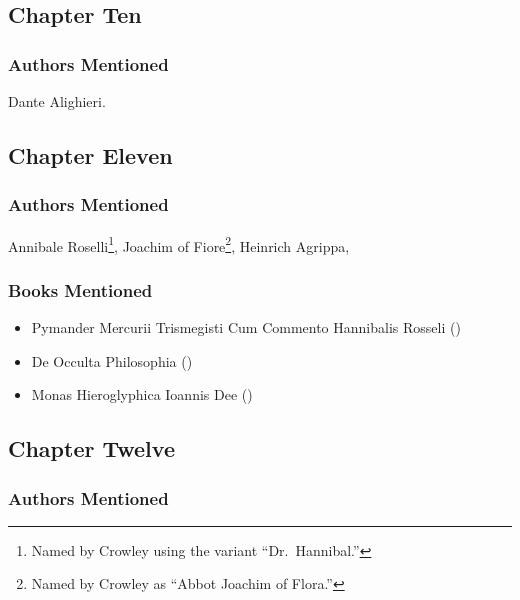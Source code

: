 \documentclass[
]{article}
\providecommand{\tightlist}{%
  \setlength{\itemsep}{0pt}\setlength{\parskip}{0pt}}
\begin{document}
\subsection{Chapter Ten}\label{chapter-ten}

\subsubsection{Authors Mentioned}\label{authors-mentioned-15}

Dante Alighieri.

\subsection{Chapter Eleven}\label{chapter-eleven}

\subsubsection{Authors Mentioned}\label{authors-mentioned-16}

Annibale Roselli\footnote{Named by Crowley using the variant
  ``Dr.~Hannibal.''}, Joachim of Fiore\footnote{Named by Crowley as
  ``Abbot Joachim of Flora.''}, Heinrich Agrippa,

\subsubsection{Books Mentioned}\label{books-mentioned-16}

\begin{itemize}
\tightlist
\item
  Pymander Mercurii Trismegisti Cum Commento Hannibalis Rosseli
  ()
\item
  De Occulta Philosophia ()
\item
  Monas Hieroglyphica Ioannis Dee ()
\end{itemize}

\subsection{Chapter Twelve}\label{chapter-twelve}

\subsubsection{Authors Mentioned}\label{authors-mentioned-17}
\end{document}
